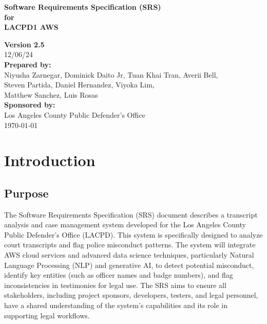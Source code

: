 \documentclass[12pt]{article}
\begin{document}
\begin{titlepage}
    \centering
    \vspace*{2cm}

    {\Huge\bfseries Software Requirements Specification (SRS)\\
    for\\
    LACPD1 AWS\\}

    \textbf{Version 2.5}\\
    12/06/24\\

    \textbf{Prepared by:}\\
    Niyusha Zarnegar, Dominick Daito Jr, Tuan Khai Tran, Averii Bell,\\
    Steven Partida, Daniel Hernandez, Viyoka Lim,\\
    Matthew Sanchez, Luis Rosas\\

    \textbf{Sponsored by:}\\
    Los Angeles County Public Defender's Office\\

    \vfill
    {\large \today}
\end{titlepage}

\tableofcontents
\setcounter{tocdepth}{3}  


\newpage

\section{Introduction}
\subsection{Purpose}
The Software Requirements Specification (SRS) document describes a transcript analysis
 and case management system developed for the Los Angeles County Public Defender’s Office
 (LACPD). This system is specifically designed to analyze court transcripts and flag police
 misconduct patterns. The system will integrate AWS cloud services and advanced data science
 techniques, particularly Natural Language Processing (NLP) and generative AI, to detect
 potential misconduct, identify key entities (such as officer names and badge numbers), and flag
 inconsistencies in testimonies for legal use.
 The SRS aims to ensure all stakeholders, including project sponsors, developers, testers,
 and legal personnel, have a shared understanding of the system’s capabilities and its role in
 supporting legal workflows.
\end{document}
